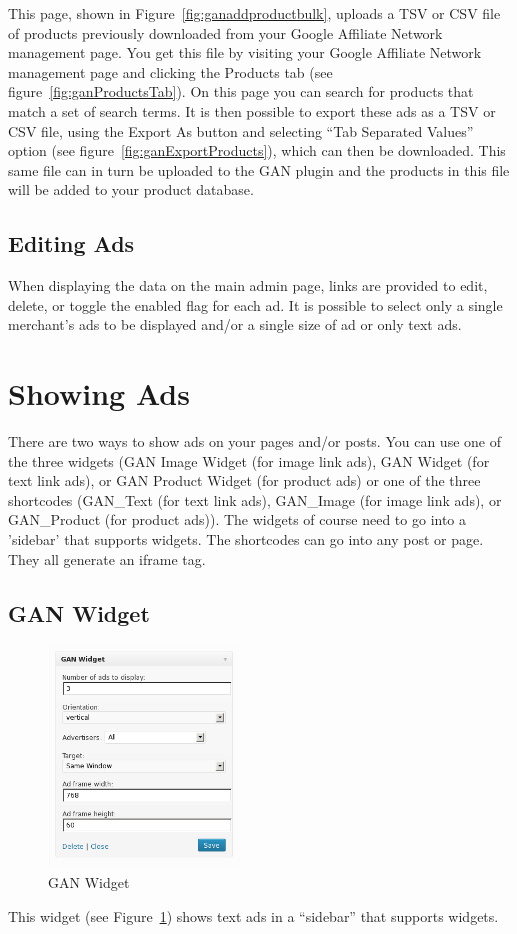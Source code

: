 \documentclass[letterpaper]{article}
\begin{document}
This page, shown in Figure~\ref{fig:ganaddproductbulk}, uploads a TSV
or CSV file of products previously downloaded from your Google Affiliate
Network management page. You get this file by visiting your Google
Affiliate Network management page and clicking the Products tab (see
figure~\ref{fig:ganProductsTab}). On this page you can search for
products that match a set of search terms. It is then possible to export
these ads as a TSV or CSV file, using the Export As button and selecting ``Tab
Separated Values'' option (see figure~\ref{fig:ganExportProducts}),
which can then be downloaded. This same file can in turn be uploaded to
the GAN plugin and the products in this file will be added to your product
database.

\subsection{Editing Ads}

When displaying the data on the main admin page, links are provided to
edit, delete, or toggle the enabled flag for each ad. It is possible to
select only a single merchant's ads to be displayed and/or a single
size of ad or only text ads.

\section{Showing Ads}

There are two ways to show ads on your pages and/or posts.  You can use
one of the three widgets (GAN Image Widget (for image link ads), GAN
Widget (for text link ads), or GAN Product Widget (for product ads) or
one of the three shortcodes (GAN\_Text (for text link ads), GAN\_Image
(for image link ads), or GAN\_Product (for product ads)).  The widgets
of course need to go into a 'sidebar' that supports widgets.  The
shortcodes can go into any post or page.  They all generate an iframe
tag.

\subsection{GAN Widget}

\begin{figure}[ht]
\begin{centering}
\includegraphics[width=2in]{ganwidget.png}
\caption{GAN Widget}
\label{fig:ganwidget}
\end{centering}
\end{figure}
This widget (see Figure~\ref{fig:ganwidget}) shows text ads in a
``sidebar'' that supports widgets.
\end{document}
